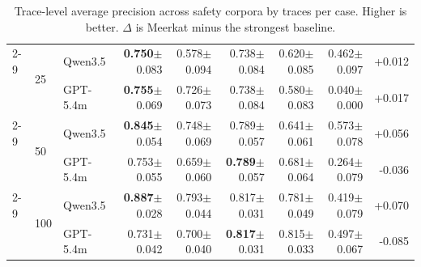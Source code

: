 \documentclass{article} %
\newcommand{\res}[2]{#1{\scriptsize$\pm$#2}}
\newcommand{\bestres}[2]{\textbf{#1}{\scriptsize$\pm$#2}}
\begin{document}
\begin{table}[t]
\begin{tabular}{@{}lllrrrrrr@{}}
    \cmidrule(lr){2-9}
     & \multirow{2}{*}{25} & Qwen3.5 & \bestres{0.750}{0.083} & \res{0.578}{0.094} & \res{0.738}{0.084} & \res{0.620}{0.085} & \res{0.462}{0.097} & +0.012 \\
     & & GPT-5.4m & \bestres{0.755}{0.069} & \res{0.726}{0.073} & \res{0.738}{0.084} & \res{0.580}{0.083} & \res{0.040}{0.000} & +0.017 \\
    \cmidrule(lr){2-9}
     & \multirow{2}{*}{50} & Qwen3.5 & \bestres{0.845}{0.054} & \res{0.748}{0.069} & \res{0.789}{0.057} & \res{0.641}{0.061} & \res{0.573}{0.078} & +0.056 \\
     & & GPT-5.4m & \res{0.753}{0.055} & \res{0.659}{0.060} & \bestres{0.789}{0.057} & \res{0.681}{0.064} & \res{0.264}{0.079} & -0.036 \\
    \cmidrule(lr){2-9}
     & \multirow{2}{*}{100} & Qwen3.5 & \bestres{0.887}{0.028} & \res{0.793}{0.044} & \res{0.817}{0.031} & \res{0.781}{0.049} & \res{0.419}{0.079} & +0.070 \\
     & & GPT-5.4m & \res{0.731}{0.042} & \res{0.700}{0.040} & \bestres{0.817}{0.031} & \res{0.815}{0.033} & \res{0.497}{0.067} & -0.085 \\
    \bottomrule
  \end{tabular}
  \caption{Trace-level average precision across safety corpora by traces per case. Higher is better. $\Delta$ is Meerkat minus the strongest baseline.}
  \label{tab:reward-ap}
\end{table}
\end{document}
